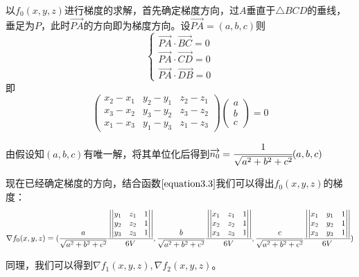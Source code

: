 \documentclass[12pt,a4paper]{article}
\begin{document}
以$f_0(x,y,z)$进行梯度的求解，首先确定梯度方向，过$A$垂直于$\triangle BCD$的垂线，垂足为$P$，此时$\overrightarrow {P A}$的方向即为梯度方向。设$\overrightarrow {P A}=(a,b,c)$则$$\begin{cases}\overrightarrow {P A} \cdot \overrightarrow {B C}=0\\ \overrightarrow {P A} \cdot \overrightarrow {C D}=0\\ \overrightarrow {P A} \cdot \overrightarrow {D B}=0
\end{cases}$$
即\begin{equation}
\begin{pmatrix}
x_2-x_1&y_2-y_1&z_2-z_1\\
x_3-x_2&y_3-y_2&z_3-z_2\\
x_1-x_3&y_1-y_3&z_1-z_3
\end{pmatrix}
\begin{pmatrix}
a\\b\\c
\end{pmatrix}=0
\end{equation}

由假设知$(a,b,c)$有唯一解，将其单位化后得到$\overrightarrow {n_0}=\cfrac {1}{\sqrt {a^2+b^2+c^2}}(a,b,c)$

现在已经确定梯度的方向，结合函数$\ref{equation3.3}$我们可以得出$f_0(x,y,z)$的梯度：$$\nabla f_0(x,y,z)=(\cfrac {a}{\sqrt {a^2+b^2+c^2}} \cfrac{\left|\begin{vmatrix}
	y_1&z_1&1\\y_2&z_2&1\\y_3&z_3&1
	\end{vmatrix}\right|}{6V},
\cfrac {b}{\sqrt {a^2+b^2+c^2}} \cfrac{\left|\begin{vmatrix}
	x_1&z_1&1\\x_2&z_2&1\\x_3&z_3&1
	\end{vmatrix}\right|}{6V},\cfrac {c}{\sqrt {a^2+b^2+c^2}} \cfrac{\left|\begin{vmatrix}
	x_1&y_1&1\\x_2&y_2&1\\x_3&y_3&1
	\end{vmatrix}\right|}{6V})$$

同理，我们可以得到$\nabla f_1(x,y,z),\nabla f_2(x,y,z)$。
\end{document}
